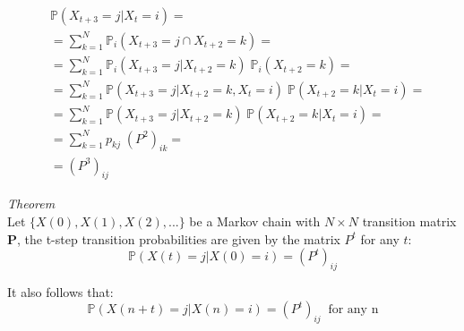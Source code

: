 \documentclass[\main/main.tex]{subfiles}
\begin{document}
\begin{equation}
\begin{split}
&\mathds{P}( X_{t+3}= j | X_t = i) =\\
&= \sum_{k= 1}^{N} \mathds{P}_i( X_{t+3} = j \cap X_{t+2} = k) =\\
&= \sum_{k= 1}^{N} \mathds{P}_i( X_{t+3} = j | X_{t+2} = k)\; \mathds{P}_i(X_{t+2} = k)=\\
&= \sum_{k= 1}^{N} \mathds{P}( X_{t+3} = j | X_{t+2} = k,X_{t} = i)\; \mathds{P}(X_{t+2} = k | X_{t} = i)=\\
&= \sum_{k= 1}^{N} \mathds{P}( X_{t+3} = j | X_{t+2} = k)\; \mathds{P}(X_{t+2} = k | X_{t} = i)=\\
&=\sum_{k= 1}^{N} p_{kj} \; (P^2)_{ik} =\\
&= (P^3)_{ij}
\end{split}
\end{equation}


\noindent \textit{Theorem}\\
Let $\{X(0), X(1), X(2), . . .\}$ be a Markov chain with $N \times N$ transition matrix $\mathbf{P}$, the t-step transition probabilities are given by the matrix $P^t$ for any $t$:
\begin{equation}
\mathds{P}(X(t) = j |X(0) = i) = (P^t)_{ij}
\end{equation}

\noindent It also follows that:
\begin{equation}
\mathds{P}(X(n+t) = j |X(n) = i) = (P^t)_{ij} \;\; \text{for any n} 
\end{equation}
\end{document}
